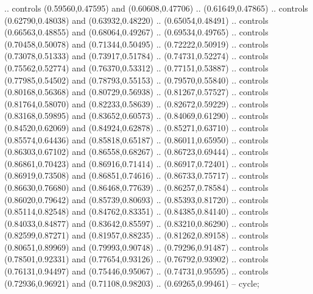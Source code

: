     .. controls (0.59560,0.47595) and (0.60608,0.47706) .. (0.61649,0.47865)
    .. controls (0.62790,0.48038) and (0.63932,0.48220) .. (0.65054,0.48491)
    .. controls (0.66563,0.48855) and (0.68064,0.49267) .. (0.69534,0.49765)
    .. controls (0.70458,0.50078) and (0.71344,0.50495) .. (0.72222,0.50919)
    .. controls (0.73078,0.51333) and (0.73917,0.51784) .. (0.74731,0.52274)
    .. controls (0.75562,0.52774) and (0.76370,0.53312) .. (0.77151,0.53887)
    .. controls (0.77985,0.54502) and (0.78793,0.55153) .. (0.79570,0.55840)
    .. controls (0.80168,0.56368) and (0.80729,0.56938) .. (0.81267,0.57527)
    .. controls (0.81764,0.58070) and (0.82233,0.58639) .. (0.82672,0.59229)
    .. controls (0.83168,0.59895) and (0.83652,0.60573) .. (0.84069,0.61290)
    .. controls (0.84520,0.62069) and (0.84924,0.62878) .. (0.85271,0.63710)
    .. controls (0.85574,0.64436) and (0.85818,0.65187) .. (0.86011,0.65950)
    .. controls (0.86303,0.67102) and (0.86558,0.68267) .. (0.86723,0.69444)
    .. controls (0.86861,0.70423) and (0.86916,0.71414) .. (0.86917,0.72401)
    .. controls (0.86919,0.73508) and (0.86851,0.74616) .. (0.86733,0.75717)
    .. controls (0.86630,0.76680) and (0.86468,0.77639) .. (0.86257,0.78584)
    .. controls (0.86020,0.79642) and (0.85739,0.80693) .. (0.85393,0.81720)
    .. controls (0.85114,0.82548) and (0.84762,0.83351) .. (0.84385,0.84140)
    .. controls (0.84033,0.84877) and (0.83642,0.85597) .. (0.83210,0.86290)
    .. controls (0.82599,0.87271) and (0.81957,0.88235) .. (0.81262,0.89158)
    .. controls (0.80651,0.89969) and (0.79993,0.90748) .. (0.79296,0.91487)
    .. controls (0.78501,0.92331) and (0.77654,0.93126) .. (0.76792,0.93902)
    .. controls (0.76131,0.94497) and (0.75446,0.95067) .. (0.74731,0.95595)
    .. controls (0.72936,0.96921) and (0.71108,0.98203) .. (0.69265,0.99461)
    -- cycle;